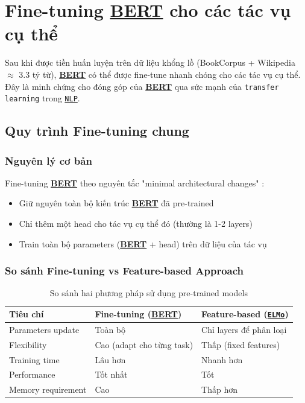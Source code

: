 \section{Fine-tuning \hyperref[acro:bert]{\textbf{BERT}} cho các tác vụ cụ thể}
\label{sec:fine_tuning_bert}

Sau khi được tiền huấn luyện trên dữ liệu khổng lồ (BookCorpus + Wikipedia $\approx$ 3.3 tỷ từ), \hyperref[acro:bert]{\textbf{BERT}} có thể được fine-tune nhanh chóng cho các tác vụ cụ thể. Đây là minh chứng cho đóng góp của \hyperref[acro:bert]{\textbf{BERT}} qua sức mạnh của \texttt{transfer learning} trong \hyperref[acro:nlp]{\texttt{NLP}}.

\subsection{Quy trình Fine-tuning chung}
\label{ssec:quy_trinh_tinh_chinh}

\subsubsection{Nguyên lý cơ bản}
Fine-tuning \hyperref[acro:bert]{\textbf{BERT}} theo nguyên tắc "minimal architectural changes" \cite{devlin2018bert}:
\begin{itemize}
    \item Giữ nguyên toàn bộ kiến trúc \hyperref[acro:bert]{\textbf{BERT}} đã pre-trained
    \item Chỉ thêm một head cho tác vụ cụ thể đó (thường là 1-2 layers)
    \item Train toàn bộ parameters (\hyperref[acro:bert]{\textbf{BERT}} + head) trên dữ liệu của tác vụ
\end{itemize}

\subsubsection{So sánh Fine-tuning vs Feature-based Approach}
\begin{table}[H]
\centering
\caption{So sánh hai phương pháp sử dụng pre-trained models}
\label{tab:finetune_vs_feature}
\begin{tabular}{lll}
\toprule
\textbf{Tiêu chí} & \textbf{Fine-tuning (\hyperref[acro:bert]{\textbf{BERT}})} & \textbf{Feature-based (\hyperref[acro:elmo]{\texttt{ELMo}})} \\
\midrule
Parameters update & Toàn bộ & Chỉ layers để phân loại \\
Flexibility & Cao (adapt cho từng task) & Thấp (fixed features) \\
Training time & Lâu hơn & Nhanh hơn \\
Performance & Tốt nhất & Tốt \\
Memory requirement & Cao & Thấp hơn \\
\bottomrule
\end{tabular}
\end{table}

